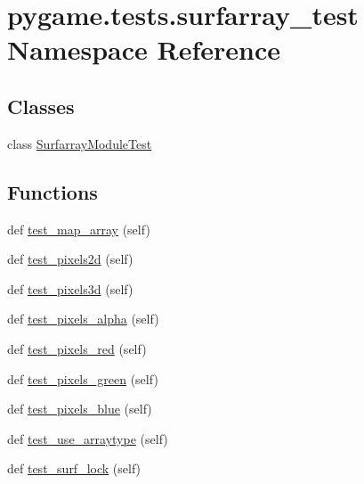 \hypertarget{namespacepygame_1_1tests_1_1surfarray__test}{}\section{pygame.\+tests.\+surfarray\+\_\+test Namespace Reference}
\label{namespacepygame_1_1tests_1_1surfarray__test}
\subsection*{Classes}
\begin{DoxyCompactItemize}
\item 
class \hyperlink{classpygame_1_1tests_1_1surfarray__test_1_1_surfarray_module_test}{Surfarray\+Module\+Test}
\end{DoxyCompactItemize}
\subsection*{Functions}
\begin{DoxyCompactItemize}
\item 
def \hyperlink{namespacepygame_1_1tests_1_1surfarray__test_ac0b928674da7c8ace7bb40b26946cec5}{test\+\_\+map\+\_\+array} (self)
\item 
def \hyperlink{namespacepygame_1_1tests_1_1surfarray__test_acd13841435a33f3e352604877713f180}{test\+\_\+pixels2d} (self)
\item 
def \hyperlink{namespacepygame_1_1tests_1_1surfarray__test_a568d88a366d3aa09839af1fc714c51f2}{test\+\_\+pixels3d} (self)
\item 
def \hyperlink{namespacepygame_1_1tests_1_1surfarray__test_a73d16f325c3c81d41b5c16abbe25fbb2}{test\+\_\+pixels\+\_\+alpha} (self)
\item 
def \hyperlink{namespacepygame_1_1tests_1_1surfarray__test_abc0df3e13841e43af20d77c71f7eed04}{test\+\_\+pixels\+\_\+red} (self)
\item 
def \hyperlink{namespacepygame_1_1tests_1_1surfarray__test_a372c6348beaf0b7c65e11bb910c91914}{test\+\_\+pixels\+\_\+green} (self)
\item 
def \hyperlink{namespacepygame_1_1tests_1_1surfarray__test_af7adaac6f86309f9911d8ff5e837904b}{test\+\_\+pixels\+\_\+blue} (self)
\item 
def \hyperlink{namespacepygame_1_1tests_1_1surfarray__test_ada4f3f85ceecb979573bc5699fccdc83}{test\+\_\+use\+\_\+arraytype} (self)
\item 
def \hyperlink{namespacepygame_1_1tests_1_1surfarray__test_a859af3be59699ee393c682e9e7d629a6}{test\+\_\+surf\+\_\+lock} (self)
\end{DoxyCompactItemize}

